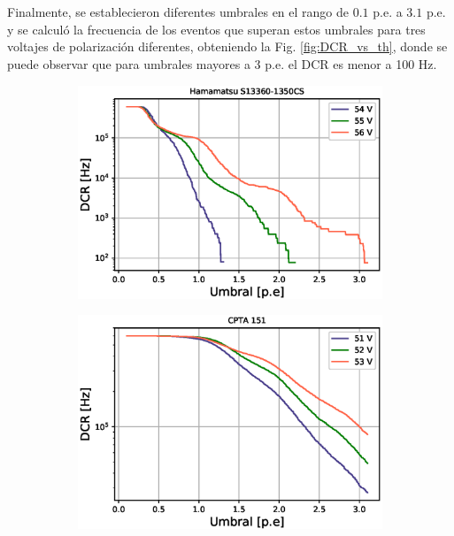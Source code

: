\begin{figure}[h!]
\begin{subfigure}[b]{0.49\textwidth}
         \label{fig:DCR_ov_CPTA}
     \end{subfigure}
        \label{fig:DCR_vs_ov}
\end{figure}
\\ \\
Finalmente, se establecieron diferentes umbrales en el rango de $0.1$ p.e. a $3.1$ p.e. y se calculó la frecuencia de los eventos que superan estos umbrales para tres voltajes de polarización diferentes, obteniendo la Fig. \ref{fig:DCR_vs_th}, donde se puede observar que para umbrales mayores a 3 p.e. el DCR es menor a 100 Hz.  
\begin{figure}[h!]
     \centering
        \caption{Tasa de conteo oscuro en función de un umbral de $0.1$ p.e. a $3.1$ p.e. para tres voltajes de polarización: 54 V, 55 V y 56 V para el SiPM S13360-1350CS de Hamamatsu (izquierda) y 51 V, 52 V y 53 V para el CPTA 151 (derecha).}
     \begin{subfigure}[b]{0.49\textwidth}
         \centering
         \includegraphics[width=1.1\textwidth]{Images/DCR_vs_th_1350CS.eps}
         \label{fig:DCR_vs_th_1}
     \end{subfigure}
     \begin{subfigure}[b]{0.49\textwidth}
         \centering
         \includegraphics[width=1.1\textwidth]{Images/DCR_vs_th_CPTA.eps}

\end{subfigure}
\end{figure}
